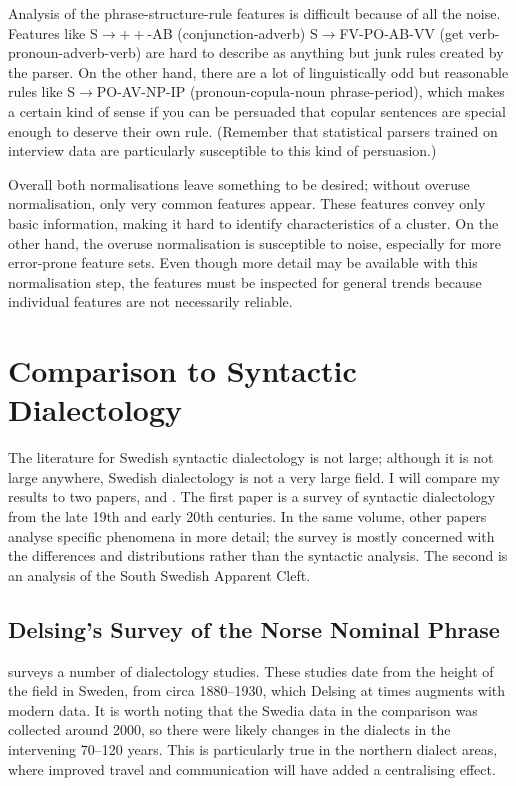 Analysis of the phrase-structure-rule features is difficult because of
all the noise. Features like S$\to++$-AB (conjunction-adverb)
S$\to$FV-PO-AB-VV (get verb-pronoun-adverb-verb) are hard to describe
as anything but junk rules created by the parser. On the other hand,
there are a lot of linguistically odd but reasonable rules like
S$\to$PO-AV-NP-IP (pronoun-copula-noun phrase-period), which makes a
certain kind of sense if you can be persuaded that copular sentences
are special enough to deserve their own rule. (Remember that
statistical parsers trained on interview data are particularly
susceptible to this kind of persuasion.)

Overall both normalisations leave something to be desired; without
overuse normalisation, only very common features appear. These
features convey only basic information, making it hard to identify
characteristics of a cluster. On the other hand, the overuse
normalisation is susceptible to noise, especially for more error-prone
feature sets. Even though more detail may be available with this
normalisation step, the features must be inspected for general trends
because individual features are not necessarily reliable.

\section{Comparison to Syntactic Dialectology}

The literature for Swedish syntactic dialectology is not large;
although it is not large anywhere, Swedish dialectology is not a very
large field. I will compare my results to two papers,
 and . The first paper is a
survey of syntactic dialectology from the late 19th and early 20th
centuries. In the same volume, other papers analyse specific phenomena
in more detail; the survey is mostly concerned with the differences
and distributions rather than the syntactic analysis. The second
is an analysis of the South Swedish Apparent Cleft.

\subsection{Delsing's Survey of the Norse Nominal Phrase}

 surveys a number of dialectology studies. These
studies date from the height of the field in Sweden, from circa
1880--1930, which Delsing at times augments with modern data. It is
worth noting that the Swedia data in the comparison was collected
around 2000, so there were likely changes in the dialects in the
intervening 70--120 years. This is particularly true in the northern
dialect areas, where improved travel and communication will have added
a centralising effect.

